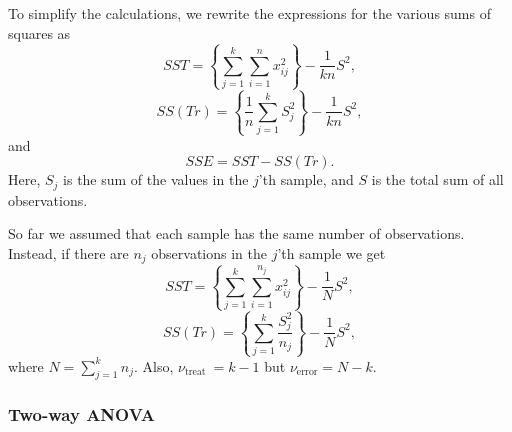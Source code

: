 To simplify the calculations, we rewrite the expressions for the various sums of squares as
\begin{equation}
SST = \left \{ \sum^k_{j=1} \sum^n_{i=1} x^2_{ij} \right \} - \frac{1}{kn} S^2,
\end{equation}
\begin{equation}
SS(Tr) = \left \{ \frac{1}{n}  \sum^k_{j=1} S^2_j \right \} - \frac{1}{kn} S^2,
\end{equation}
and
\begin{equation}
SSE = SST - SS(Tr).
\end{equation}
Here, $S_j$ is the sum of the values in the $j$'th sample, and $S$  is the total sum of all observations.

	So far we assumed that each sample has the same number of observations.  Instead, if there are $n_j$ 
observations in the $j$'th sample we get
\begin{equation}
SST = \left \{ \sum^k_{j=1} \sum^{n_j}_{i=1} x^2_{ij} \right \} - \frac{1}{N} S^2,
\end{equation}
\begin{equation}
SS(Tr) = \left \{ \sum^k_{j=1} \frac{S^2_j}{n_j} \right \} - \frac{1}{N} S^2,
\end{equation}
where $\displaystyle N = \sum^k_{j=1} n_j$.  Also, $\nu_{\mbox{treat}} \ = k-1$ but $\nu_{\mbox{error}} = N-k$.

\subsubsection{Two-way ANOVA}

